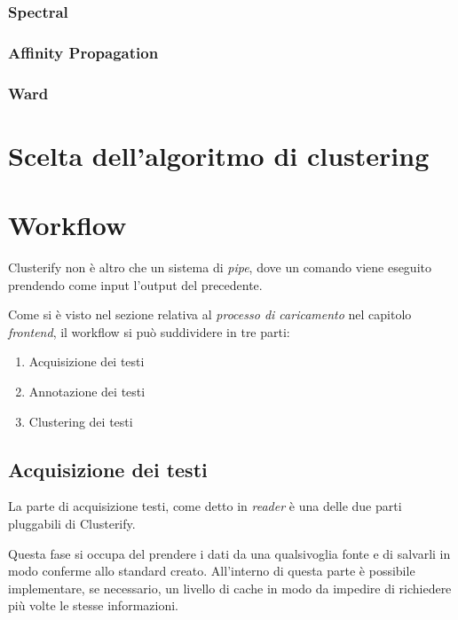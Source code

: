 		\subsubsection{Spectral}
			

		\subsubsection{Affinity Propagation}
			

		\subsubsection{Ward}
			
		

\section{Scelta dell'algoritmo di clustering}
	

\section{Workflow}
	Clusterify non è altro che un sistema di \emph{pipe}, dove un comando viene eseguito prendendo come input l'output del precedente.

	Come si è visto nel sezione relativa al \emph{processo di caricamento} nel capitolo \emph{frontend}, il workflow si può suddividere in tre parti:

	\begin{enumerate}
  		\item Acquisizione dei testi
  		\item Annotazione dei testi
 		\item Clustering dei testi
	\end{enumerate} 
	
	\subsection{Acquisizione dei testi}
		La parte di acquisizione testi, come detto in \emph{reader} è una delle due parti pluggabili di Clusterify.

		Questa fase si occupa del prendere i dati da una qualsivoglia fonte e di salvarli in modo conferme allo standard creato. All'interno di questa parte è possibile implementare, se necessario, un livello di cache in modo da impedire di richiedere più volte le stesse informazioni.

